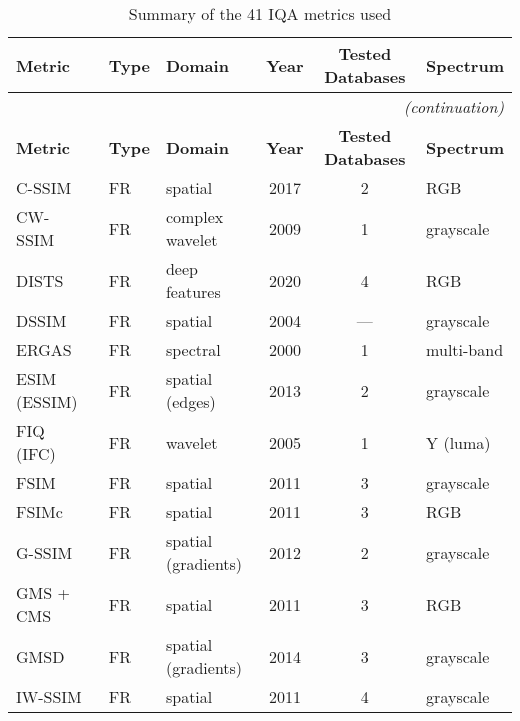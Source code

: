 \begin{longtable}{l l l c c l}
    \caption{Summary of the 41 IQA metrics used}\label{tab:fr_iqa_metrics}\\
    \hline %
    \textbf{Metric} & \textbf{Type} & \textbf{Domain} & \textbf{Year} & \textbf{Tested Databases} & \textbf{Spectrum}\\
    \hline %
    \endfirsthead %
    \multicolumn{6}{r}{\small\itshape(continuation)}\\ %
    \hline %
    \textbf{Metric} & \textbf{Type} & \textbf{Domain} & \textbf{Year} & \textbf{Tested Databases} & \textbf{Spectrum}\\
    \hline %
    \endhead %
    \hline %
    \endfoot %
    
    C-SSIM~\cite{Hassan2017CSSIM}          & FR   & spatial             & 2017 & 2    & RGB \\
    CW-SSIM~\cite{Sampat2009CWSSIM}        & FR   & complex wavelet     & 2009 & 1    & grayscale \\
    DISTS~\cite{Ding2020DISTS}             & FR   & deep features       & 2020 & 4    & RGB \\
    DSSIM~\cite{Wang2004SSIM}              & FR   & spatial             & 2004 & ---  & grayscale \\
    ERGAS~\cite{Ranchin2000ERGAS}          & FR   & spectral            & 2000 & 1    & multi-band \\
    ESIM (ESSIM)~\cite{Zhang2013ESSIM}     & FR   & spatial (edges)     & 2013 & 2    & grayscale \\
    FIQ (IFC)~\cite{Sheikh2005IFC}         & FR   & wavelet             & 2005 & 1    & Y (luma) \\
    FSIM~\cite{Zhang2011FSIM}              & FR   & spatial             & 2011 & 3    & grayscale \\
    FSIMc~\cite{Zhang2011FSIM}             & FR   & spatial             & 2011 & 3    & RGB \\
    G-SSIM~\cite{Liu2012GSSIM}             & FR   & spatial (gradients) & 2012 & 2    & grayscale \\
    GMS + CMS~\cite{Zhang2011FSIM}         & FR   & spatial             & 2011 & 3    & RGB \\
    GMSD~\cite{Xue2014GMSD}                & FR   & spatial (gradients) & 2014 & 3    & grayscale \\
    IW-SSIM~\cite{Li2011IWSSIM}            & FR   & spatial             & 2011 & 4    & grayscale \\

\end{longtable}
